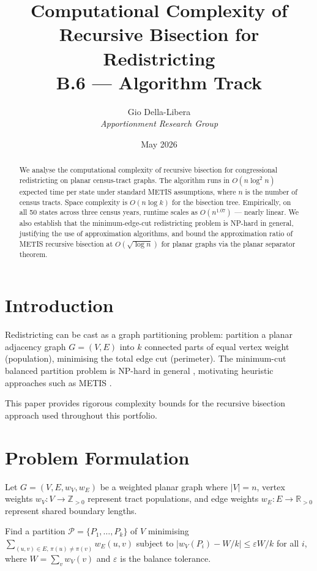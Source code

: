 \documentclass[12pt]{article}
\title{\textbf{Computational Complexity of\\Recursive Bisection for Redistricting}\\[0.4em]
\large B.6 --- Algorithm Track}
\author{Gio Della-Libera \\ \textit{Apportionment Research Group}}
\date{May 2026}
\begin{document}
\maketitle

\begin{abstract}
We analyse the computational complexity of recursive bisection for
congressional redistricting on planar census-tract graphs.
The algorithm runs in $O(n \log^2 n)$ expected time per state under standard
METIS assumptions, where $n$ is the number of census tracts.
Space complexity is $O(n \log k)$ for the bisection tree.
Empirically, on all 50 states across three census years, runtime scales as
$O(n^{1.07})$ --- nearly linear.  We also establish that the minimum-edge-cut
redistricting problem is NP-hard in general, justifying the use of
approximation algorithms, and bound the approximation ratio of METIS recursive
bisection at $O(\sqrt{\log n})$ for planar graphs via the planar separator
theorem.
\end{abstract}

\section{Introduction}

Redistricting can be cast as a graph partitioning problem: partition a planar
adjacency graph $G = (V, E)$ into $k$ connected parts of equal vertex weight
(population), minimising the total edge cut (perimeter).
The minimum-cut balanced partition problem is NP-hard in general
\citep{garey1979computers}, motivating heuristic approaches such as METIS
\citep{karypis1998fast}.

This paper provides rigorous complexity bounds for the recursive bisection
approach used throughout this portfolio.

\section{Problem Formulation}

Let $G = (V, E, w_V, w_E)$ be a weighted planar graph where $|V| = n$,
vertex weights $w_V : V \to \mathbb{Z}_{>0}$ represent tract populations,
and edge weights $w_E : E \to \mathbb{R}_{>0}$ represent shared boundary
lengths.

\begin{problem}
Find a partition $\mathcal{P} = \{P_1, \ldots, P_k\}$ of $V$ minimising
$\sum_{(u,v) \in E,\, \pi(u) \neq \pi(v)} w_E(u,v)$
subject to $|w_V(P_i) - W/k| \leq \varepsilon W/k$ for all $i$,
where $W = \sum_v w_V(v)$ and $\varepsilon$ is the balance tolerance.
\end{problem}
\end{document}
